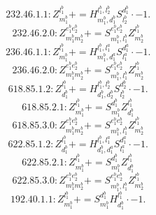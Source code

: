 \documentclass[letterpaper,10pt,fleqn,leqno,onecolumn]{article}
\begin{document}
\begin{equation} \;\;\;\;\;\;  232.46.1.1: Z^{l_{1}^{b}}_{m_{1}^{b}}+=H^{l_{1}^{b},l_{2}^{b}}_{m_{1}^{b},d_{1}^{b}}S^{d_{1}^{b}}_{l_{2}^{b}}\cdot -1. \end{equation}
\begin{equation} \;\;\;\;\;\;  232.46.2.0: Z^{e_{1}^{b}e_{2}^{b}}_{m_{1}^{b}m_{2}^{b}}+=S^{e_{1}^{b}e_{2}^{b}}_{m_{1}^{b},l_{1}^{b}}Z^{l_{1}^{b}}_{m_{2}^{b}} \end{equation}
\begin{equation} \;\;\;\;\;\;  236.46.1.1: Z^{l_{1}^{b}}_{m_{1}^{b}}+=H^{l_{1}^{b},l_{1}^{a}}_{m_{1}^{b},d_{1}^{a}}S^{d_{1}^{a}}_{l_{1}^{a}}\cdot -1. \end{equation}
\begin{equation} \;\;\;\;\;\;  236.46.2.0: Z^{e_{1}^{b}e_{2}^{b}}_{m_{1}^{b}m_{2}^{b}}+=S^{e_{1}^{b}e_{2}^{b}}_{m_{1}^{b},l_{1}^{b}}Z^{l_{1}^{b}}_{m_{2}^{b}} \end{equation}
\begin{equation} \;\;\;\;\;\;  618.85.1.2: Z^{l_{1}^{b}}_{d_{1}^{b}}+=H^{l_{1}^{b},l_{2}^{b}}_{d_{1}^{b},d_{2}^{b}}S^{d_{2}^{b}}_{l_{2}^{b}}\cdot -1. \end{equation}
\begin{equation} \;\;\;\;\;\;  618.85.2.1: Z^{l_{1}^{b}}_{m_{1}^{b}}+=S^{d_{1}^{b}}_{m_{1}^{b}}Z^{l_{1}^{b}}_{d_{1}^{b}} \end{equation}
\begin{equation} \;\;\;\;\;\;  618.85.3.0: Z^{e_{1}^{b}e_{2}^{b}}_{m_{1}^{b}m_{2}^{b}}+=S^{e_{1}^{b}e_{2}^{b}}_{m_{1}^{b},l_{1}^{b}}Z^{l_{1}^{b}}_{m_{2}^{b}} \end{equation}
\begin{equation} \;\;\;\;\;\;  622.85.1.2: Z^{l_{1}^{b}}_{d_{1}^{b}}+=H^{l_{1}^{b},l_{1}^{a}}_{d_{1}^{b},d_{1}^{a}}S^{d_{1}^{a}}_{l_{1}^{a}}\cdot -1. \end{equation}
\begin{equation} \;\;\;\;\;\;  622.85.2.1: Z^{l_{1}^{b}}_{m_{1}^{b}}+=S^{d_{1}^{b}}_{m_{1}^{b}}Z^{l_{1}^{b}}_{d_{1}^{b}} \end{equation}
\begin{equation} \;\;\;\;\;\;  622.85.3.0: Z^{e_{1}^{b}e_{2}^{b}}_{m_{1}^{b}m_{2}^{b}}+=S^{e_{1}^{b}e_{2}^{b}}_{m_{1}^{b},l_{1}^{b}}Z^{l_{1}^{b}}_{m_{2}^{b}} \end{equation}
\begin{equation} \;\;\;\;\;\;  192.40.1.1: Z^{l_{1}^{b}}_{m_{1}^{b}}+=S^{d_{1}^{b}}_{m_{1}^{b}}H^{l_{1}^{b}}_{d_{1}^{b}}\cdot -1. \end{equation}
\end{document}
